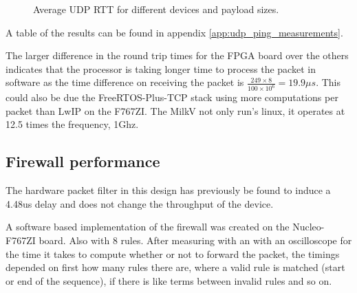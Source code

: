 \begin{figure}[ht]
    \centering
    \caption{Average UDP RTT for different devices and payload sizes.}
    \label{fig:avg_udp_rtt}
    \end{figure}
    
A table of the results can be found in appendix \ref{app:udp_ping_measurements}.

The larger difference in the round trip times for the FPGA board over the others indicates that the processor is taking longer time to process the packet in software as the time difference on receiving the packet is $\frac{249 \times 8}{100 \times 10^6}=19.9\mu s$. This could also be due the FreeRTOS-Plus-TCP stack using more computations per packet than LwIP on the F767ZI. The MilkV not only run's linux, it operates at 12.5 times the frequency, 1Ghz. 

\subsection{Firewall performance}

The hardware packet filter in this design has previously be found to induce a 4.48us delay and does not change the throughput of the device. 

A software based implementation of the firewall was created on the Nucleo-F767ZI board. Also with 8 rules. After measuring with an with an oscilloscope for the time it takes to compute whether or not to forward the packet, the timings depended on first how many rules there are, where a valid rule is matched (start or end of the sequence), if there is like terms between invalid rules and so on. 

